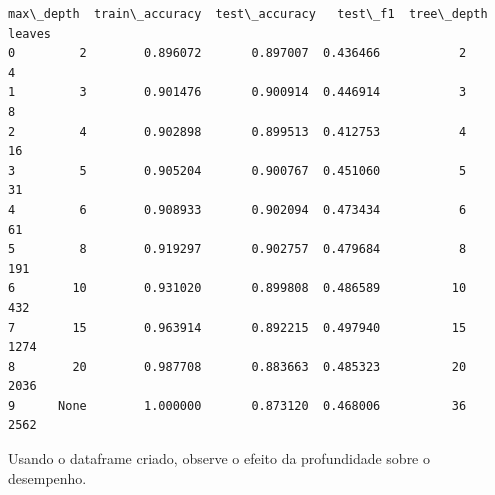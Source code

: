 \documentclass[11pt]{article}
\makeatletter
\newcommand{\boxspacing}{\kern\kvtcb@left@rule\kern\kvtcb@boxsep}
\newcommand{\prompt}[4]{
        {\ttfamily\llap{{\color{#2}[#3]:\hspace{3pt}#4}}\vspace{-\baselineskip}}
    }
\makeatother
\begin{document}
            \begin{tcolorbox}[breakable, size=fbox, boxrule=.5pt, pad at break*=1mm, opacityfill=0]
\prompt{Out}{outcolor}{15}{\boxspacing}
\begin{Verbatim}[commandchars=\\\{\}]
  max\_depth  train\_accuracy  test\_accuracy   test\_f1  tree\_depth  leaves
0         2        0.896072       0.897007  0.436466           2       4
1         3        0.901476       0.900914  0.446914           3       8
2         4        0.902898       0.899513  0.412753           4      16
3         5        0.905204       0.900767  0.451060           5      31
4         6        0.908933       0.902094  0.473434           6      61
5         8        0.919297       0.902757  0.479684           8     191
6        10        0.931020       0.899808  0.486589          10     432
7        15        0.963914       0.892215  0.497940          15    1274
8        20        0.987708       0.883663  0.485323          20    2036
9      None        1.000000       0.873120  0.468006          36    2562
\end{Verbatim}
\end{tcolorbox}
        
    Usando o dataframe criado, observe o efeito da profundidade sobre o
desempenho.
\end{document}
